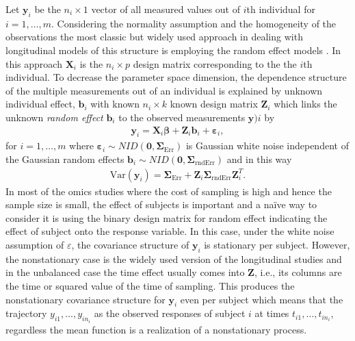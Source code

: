 \documentclass[]{article}
\begin{document}
	Let $\mathbf{y}_i$ be the $n_i\times1$ vector of all measured values out of $i$th individual for $i=1,\ldots,m$. Considering the normality assumption and the homogeneity of the observations the most classic but widely used approach in dealing with longitudinal models of this structure is employing the random effect models \citep{LairdWare}. In this approach $\mathbf{X}_i$ is the $n_i\times p$ design matrix corresponding to the the $i$th individual. To decrease the parameter space dimension, the dependence structure of the multiple measurements out of an individual is explained by unknown individual effect, $\mathbf{b}_i$ with known $n_i\times k$ known design matrix $\mathbf{Z}_i$ which links the unknown \textit{random effect} $\mathbf{b}_i$ to the observed measurements $\mathbf{y})i$ by 
	\begin{eqnarray}\label{LMM}
		\mathbf{y}_i=\mathbf{X}_i\boldsymbol{\beta}+\mathbf{Z}_i\mathbf{b}_i+\boldsymbol{\varepsilon}_i,
	\end{eqnarray}
	for $i=1,\ldots,m$ where $\boldsymbol{\varepsilon}_i\sim NID(\mathbf{0},\boldsymbol{\Sigma}_{\mathrm{Err}})$ is Gaussian white noise independent of the Gaussian random effects $\mathbf{b}_i\sim NID(\mathbf{0},\boldsymbol{\Sigma}_{\mathrm{rndErr}})$ and in this way
	\begin{eqnarray}\label{LMMVar}
		\mathrm{Var}(\mathbf{y}_i)=\boldsymbol{\Sigma}_{\mathrm{Err}}+\mathbf{Z}_i\boldsymbol{\Sigma}_{\mathrm{rndErr}}\mathbf{Z}_i^T. 
	\end{eqnarray}
	In most of the omics studies where the cost of sampling is high and hence the sample size is small, the effect of subjects is important and a na\"ive way to consider it is using the binary design matrix for random effect indicating the effect of subject onto the response variable. In this case, under the white noise assumption of $\varepsilon$, the covariance structure of $\mathbf{y}_i$ is stationary per subject. However, the nonstationary case is the widely used version of the longitudinal studies and in the unbalanced case the time effect usually comes into $\mathbf{Z}$, i.e., its columns are the time or squared value of the time of sampling. This produces the nonstationary covariance structure for $\mathbf{y}_i$ even per subject which means that the trajectory $y_{i1},\ldots,y_{in_i}$ as the observed responses of subject $i$ at times $t_{i1},\ldots,t_{in_i}$, regardless the mean function is a realization of a nonstationary process.  
	
\end{document}
